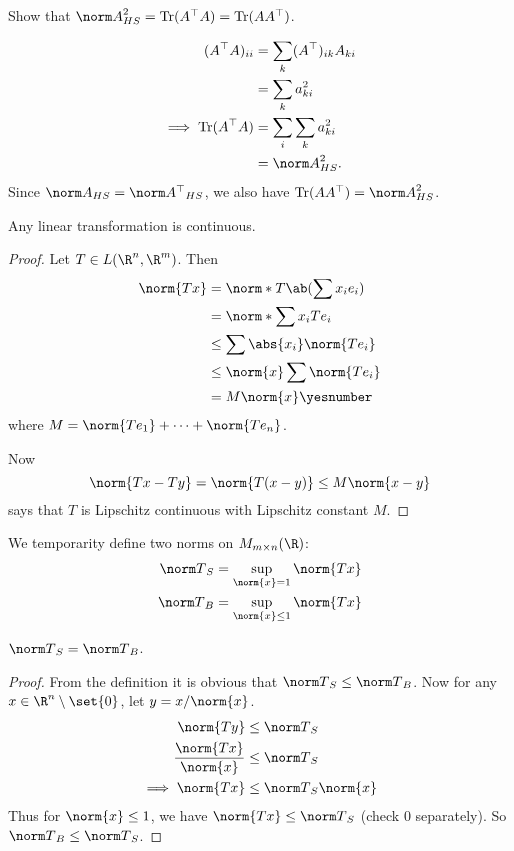 \begin{exercise}
    Show that $\hsn A^2 = \Tr(A^\T A) = \Tr(AA^\T)$.
\end{exercise}
\begin{solution}
    \begin{align*}
        (A^\T A)_{i i} &= \sum_k (A^\T)_{i k} A_{k i} \\
            &= \sum_k a_{k i}^2 \\
        \implies \Tr(A^\T A) &= \sum_i \sum_k a_{k i}^2 \\
            &= \hsn A^2.
    \end{align*}
    Since $\hsn A = \hsn{A^\T}$, we also have $\Tr(AA^\T) = \hsn A^2$.
\end{solution}
\begin{proposition}
    Any linear transformation is continuous.
\end{proposition}
\begin{proof}
    Let $T \in L(\R^n, \R^m)$.
    Then \begin{align*}
        \norm{Tx} &= \norm*{T\ab(\sum x_i e_i)} \\
                 &= \norm*{\sum x_i Te_i} \\
                 &\le \sum \abs{x_i} \norm{T e_i} \\
                 &\le \norm{x} \sum \norm{T e_i} \\
                 &= M \norm{x} \yesnumber \label{eq:operator_norm}
    \end{align*} where $M = \norm{Te_1} + \cdots + \norm{Te_n}$.

    Now \[
        \norm{Tx - Ty} = \norm{T(x - y)} \le M \norm{x - y}
    \] says that $T$ is Lipschitz continuous with Lipschitz constant $M$.
\end{proof}

We temporarity define two norms on $M_{m \times n}(\R)$:
\begin{align*}
    {\norm T}_S &= \sup_{\norm{x} = 1} \norm{Tx} \\
    {\norm T}_B &= \sup_{\norm{x} \le 1} \norm{Tx}
\end{align*}
\begin{lemma} \label{lem:operator_norm}
    ${\norm T}_S = {\norm T}_B$.
\end{lemma}
\begin{proof}
    From the definition it is obvious that ${\norm T}_S \le {\norm T}_B$.
    Now for any $x \in \R^n \setminus \set{0}$, let $y = x/\norm{x}$.
    \begin{align*}
        \norm{Ty} &\le {\norm T}_S \\
        \frac{\norm{Tx}}{\norm{x}} &\le {\norm T}_S \\
        \implies \norm{Tx} &\le {\norm T}_S \norm{x}
    \end{align*} Thus for $\norm{x} \le 1$,
    we have $\norm{Tx} \le {\norm T}_S$ (check $0$ separately).
    So ${\norm T}_B \le {\norm T}_S$.
\end{proof}

